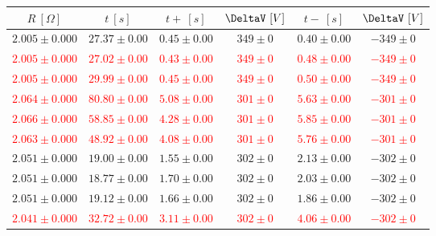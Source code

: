 \begin{table}[H]
    \centering
        \begin{tabular}{|c|c|c|c|c|c|}
        \hline
        $ R~[\Omega] $ & $ t~[s] $ & $ t+~[s] $ & $ \DeltaV~[V] $ & $ t-~[s] $ & $ \DeltaV~[V] $\\
        \hline
        $ 2.005 \pm 0.000 $ & $ 27.37 \pm 0.00 $ & $ 0.45 \pm 0.00 $ & $ 349 \pm 0 $ & $ 0.40 \pm 0.00 $ & $ -349 \pm 0 $\\
        \hline
        \textcolor{red}{$ 2.005 \pm 0.000 $} & \textcolor{red}{$ 27.02 \pm 0.00 $} & \textcolor{red}{$ 0.43 \pm 0.00 $} & \textcolor{red}{$ 349 \pm 0 $} & \textcolor{red}{$ 0.48 \pm 0.00 $} & \textcolor{red}{$ -349 \pm 0 $}\\
        \hline
        \textcolor{red}{$ 2.005 \pm 0.000 $} & \textcolor{red}{$ 29.99 \pm 0.00 $} & \textcolor{red}{$ 0.45 \pm 0.00 $} & \textcolor{red}{$ 349 \pm 0 $} & \textcolor{red}{$ 0.50 \pm 0.00 $} & \textcolor{red}{$ -349 \pm 0 $}\\
        \hline
        \textcolor{red}{$ 2.064 \pm 0.000 $} & \textcolor{red}{$ 80.80 \pm 0.00 $} & \textcolor{red}{$ 5.08 \pm 0.00 $} & \textcolor{red}{$ 301 \pm 0 $} & \textcolor{red}{$ 5.63 \pm 0.00 $} & \textcolor{red}{$ -301 \pm 0 $}\\
        \hline
        \textcolor{red}{$ 2.066 \pm 0.000 $} & \textcolor{red}{$ 58.85 \pm 0.00 $} & \textcolor{red}{$ 4.28 \pm 0.00 $} & \textcolor{red}{$ 301 \pm 0 $} & \textcolor{red}{$ 5.85 \pm 0.00 $} & \textcolor{red}{$ -301 \pm 0 $}\\
        \hline
        \textcolor{red}{$ 2.063 \pm 0.000 $} & \textcolor{red}{$ 48.92 \pm 0.00 $} & \textcolor{red}{$ 4.08 \pm 0.00 $} & \textcolor{red}{$ 301 \pm 0 $} & \textcolor{red}{$ 5.76 \pm 0.00 $} & \textcolor{red}{$ -301 \pm 0 $}\\
        \hline
        $ 2.051 \pm 0.000 $ & $ 19.00 \pm 0.00 $ & $ 1.55 \pm 0.00 $ & $ 302 \pm 0 $ & $ 2.13 \pm 0.00 $ & $ -302 \pm 0 $\\
        \hline
        $ 2.051 \pm 0.000 $ & $ 18.77 \pm 0.00 $ & $ 1.70 \pm 0.00 $ & $ 302 \pm 0 $ & $ 2.03 \pm 0.00 $ & $ -302 \pm 0 $\\
        \hline
        $ 2.051 \pm 0.000 $ & $ 19.12 \pm 0.00 $ & $ 1.66 \pm 0.00 $ & $ 302 \pm 0 $ & $ 1.86 \pm 0.00 $ & $ -302 \pm 0 $\\
        \hline
        \textcolor{red}{$ 2.041 \pm 0.000 $} & \textcolor{red}{$ 32.72 \pm 0.00 $} & \textcolor{red}{$ 3.11 \pm 0.00 $} & \textcolor{red}{$ 302 \pm 0 $} & \textcolor{red}{$ 4.06 \pm 0.00 $} & \textcolor{red}{$ -302 \pm 0 $}\\

\end{tabular}
\end{table}
